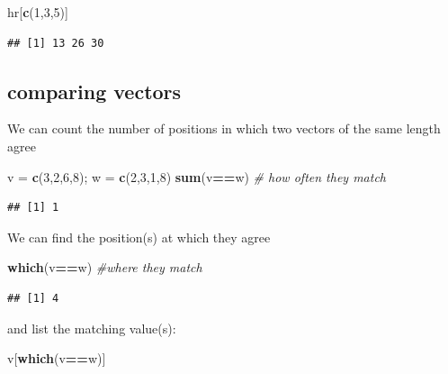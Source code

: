 \documentclass[
]{book}
\newenvironment{Shaded}{\begin{snugshade}}{\end{snugshade}}
\newcommand{\CommentTok}[1]{\textcolor[rgb]{0.56,0.35,0.01}{\textit{#1}}}
\newcommand{\DecValTok}[1]{\textcolor[rgb]{0.00,0.00,0.81}{#1}}
\newcommand{\FunctionTok}[1]{\textcolor[rgb]{0.13,0.29,0.53}{\textbf{#1}}}
\newcommand{\NormalTok}[1]{#1}
\newcommand{\OtherTok}[1]{\textcolor[rgb]{0.56,0.35,0.01}{#1}}
\newcommand{\SpecialCharTok}[1]{\textcolor[rgb]{0.81,0.36,0.00}{\textbf{#1}}}
\theoremstyle{definition}
\theoremstyle{definition}
\theoremstyle{definition}
\theoremstyle{definition}
\theoremstyle{remark}
\begin{document}
\begin{Shaded}
\begin{Highlighting}[]
\NormalTok{hr[}\FunctionTok{c}\NormalTok{(}\DecValTok{1}\NormalTok{,}\DecValTok{3}\NormalTok{,}\DecValTok{5}\NormalTok{)]}
\end{Highlighting}
\end{Shaded}

\begin{verbatim}
## [1] 13 26 30
\end{verbatim}

\subsection*{comparing vectors}\label{comparing-vectors}

We can count the number of positions in which two vectors of the same length agree

\begin{Shaded}
\begin{Highlighting}[]
\NormalTok{v }\OtherTok{=} \FunctionTok{c}\NormalTok{(}\DecValTok{3}\NormalTok{,}\DecValTok{2}\NormalTok{,}\DecValTok{6}\NormalTok{,}\DecValTok{8}\NormalTok{); w }\OtherTok{=} \FunctionTok{c}\NormalTok{(}\DecValTok{2}\NormalTok{,}\DecValTok{3}\NormalTok{,}\DecValTok{1}\NormalTok{,}\DecValTok{8}\NormalTok{)}
\FunctionTok{sum}\NormalTok{(v}\SpecialCharTok{==}\NormalTok{w) }\CommentTok{\# how often they match}
\end{Highlighting}
\end{Shaded}

\begin{verbatim}
## [1] 1
\end{verbatim}

We can find the position(s) at which they agree

\begin{Shaded}
\begin{Highlighting}[]
\FunctionTok{which}\NormalTok{(v}\SpecialCharTok{==}\NormalTok{w) }\CommentTok{\#where they match}
\end{Highlighting}
\end{Shaded}

\begin{verbatim}
## [1] 4
\end{verbatim}

and list the matching value(s):

\begin{Shaded}
\begin{Highlighting}[]
\NormalTok{v[}\FunctionTok{which}\NormalTok{(v}\SpecialCharTok{==}\NormalTok{w)] }
\end{Highlighting}
\end{Shaded}
\end{document}
